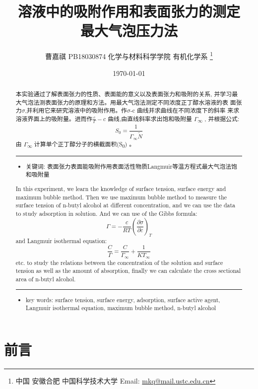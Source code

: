 \documentclass[11pt]{report}
\author{曹嘉祺 PB18030874 化学与材料科学学院 有机化学系 \thanks{中国 安徽合肥 中国科学技术大学 Email: \href{mailto:mkq@mail.ustc.edu.cn}{mkq@mail.ustc.edu.cn}}}
\date{\today}
\title{溶液中的吸附作用和表面张力的测定\\\medskip
\large 最大气泡压力法}
\begin{document}
\maketitle
\begin{abstract}
本实验通过了解表面张力的性质、表面能的意义以及表面张力和吸附的关系,
并学习最大气泡法测表面张力的原理和方法。用最大气泡法测定不同浓度正丁醇水溶液的表
面张力\(\sigma\),并利用它来研究溶液中的吸附作用。作\(\sigma\)-c 曲线并求曲线在不同浓度下的斜率
来求溶液界面上的吸附量。进而作\(\frac{c}{\Gamma}-c\) 曲线,由直线斜率求出饱和吸附量 \(\Gamma\)\textsubscript{\(\infty\)} ,
并根据公式:
\[
S_{0}=\frac{1}{\Gamma_{\infty}\widetilde{N}}
\]
由 \(\Gamma\)\textsubscript{\(\infty\)} 计算单个正丁醇分子的横截面积(S\textsubscript{0}) 。

\noindent\rule{\textwidth}{0.5pt}
\begin{itemize}
\item 关键词: 表面张力\quad 表面能\quad 吸附作用\quad 表面活性物质\quad Langmuir等温方程式\quad 最大气泡法\quad 饱和吸附量
\end{itemize}
\end{abstract}




\begin{abstract}



In this experiment, we learn the knowledge of surface tension, surface energy and
maximum bubble method. Then we use maximum bubble method to measure the surface tension
of n-butyl alcohol at different concentration, and we can use the data to study adsorption in
solution. And we can use of the Gibbs formula:
\[
\Gamma = −\frac{c}{RT}\left(\frac{\partial \sigma}{\partial c}\right)_{T}
\]
and Langmuir isothermal equation:
\[
\frac{C}{\Gamma}=\frac{C}{\Gamma_{\infty}}+\frac{1}{KT_{\infty}}
\]
 etc. to study the relations between the concentration of the solution
and surface tension as well as the amount of absorption, finally we can calculate the cross
sectional area of n-butyl alcohol.

\noindent\rule{\textwidth}{0.5pt}

\begin{itemize}
\item key words: surface tension, surface energy, adsorption, surface active agent, Langmuir isothermal equation, maximum bubble method, n-butyl alcohol
\end{itemize}
\end{abstract}
\part{前言}
\label{sec:org396f0df}
\end{document}

